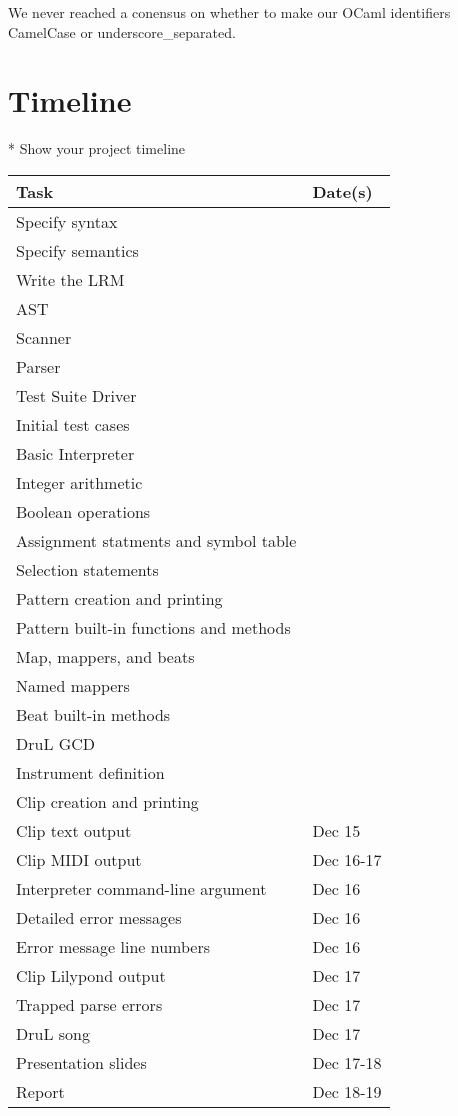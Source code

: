 We never reached a conensus on whether to make our OCaml identifiers CamelCase or underscore\_separated.

\section{Timeline}
* Show your project timeline

\begin{tabular}{ | l | l | } \hline
	\textbf{Task} & \textbf{Date(s)} \\ \hline \hline
	Specify syntax & \\ \hline
	Specify semantics & \\ \hline
	Write the LRM & \\ \hline
	AST & \\ \hline
	Scanner & \\ \hline
	Parser & \\ \hline
	Test Suite Driver & \\ \hline
	Initial test cases & \\ \hline
	Basic Interpreter & \\ \hline
	Integer arithmetic & \\ \hline
	Boolean operations & \\ \hline
	Assignment statments and symbol table & \\ \hline
	Selection statements & \\ \hline
	Pattern creation and printing & \\ \hline
	Pattern built-in functions and methods & \\ \hline
	Map, mappers, and beats & \\ \hline
	Named mappers & \\ \hline
	Beat built-in methods & \\ \hline
	DruL GCD & \\ \hline
	Instrument definition & \\ \hline
	Clip creation and printing & \\ \hline
	Clip text output & Dec 15 \\ \hline
	Clip MIDI output & Dec 16-17 \\ \hline
	Interpreter command-line argument & Dec 16 \\ \hline
	Detailed error messages & Dec 16 \\ \hline
	Error message line numbers & Dec 16 \\ \hline
	Clip Lilypond output & Dec 17 \\ \hline
	Trapped parse errors & Dec 17 \\ \hline
	DruL song & Dec 17 \\ \hline
	Presentation slides & Dec 17-18 \\ \hline
	Report & Dec 18-19 \\ \hline
\end{tabular}

